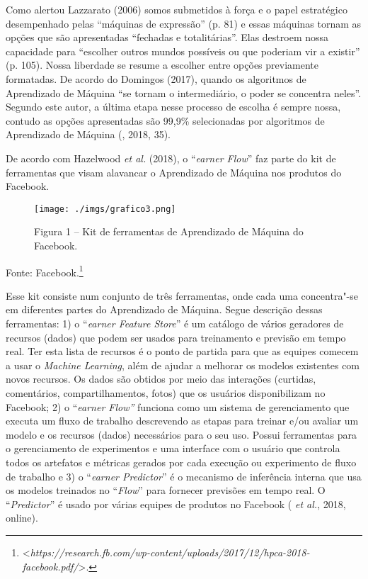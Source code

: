 Como alertou Lazzarato (2006) somos submetidos à força e o papel
estratégico desempenhado pelas ``máquinas de expressão'' (p. 81) e essas
máquinas tornam as opções que são apresentadas ``fechadas e
totalitárias''. Elas destroem nossa capacidade para ``escolher outros
mundos possíveis ou que poderiam vir a existir'' (p. 105). Nossa
liberdade se resume a escolher entre opções previamente formatadas. De
acordo do Domingos (2017), quando os algoritmos de Aprendizado de
Máquina ``se tornam o intermediário, o poder se concentra neles''.
Segundo este autor, a última etapa nesse processo de escolha é sempre
nossa, contudo as opções apresentadas são 99,9\% selecionadas por
algoritmos de Aprendizado de Máquina (, 2018, 35).

De acordo com Hazelwood \emph{et al.} (2018), o ``\emph{earner Flow}'' faz
parte do kit de ferramentas que visam alavancar o Aprendizado de Máquina
nos produtos do Facebook.

\begin{figure}[!ht]
\centering
  \texttt{[image: ./imgs/grafico3.png]}
\caption{Figura 1 -- Kit de ferramentas de Aprendizado de Máquina do Facebook.}
 \end{figure}

Fonte: Facebook.\footnote{\textless{}\emph{https://research.fb.com/wp-content/uploads/2017/12/hpca-2018-facebook.pdf/}\textgreater{}.}

Esse kit consiste num conjunto de três ferramentas, onde cada uma
concentra"-se em diferentes partes do Aprendizado de Máquina. Segue
descrição dessas ferramentas: 1) o ``\emph{earner Feature Store}'' é
um catálogo de vários geradores de recursos (dados) que podem ser usados
para treinamento e previsão em tempo real. Ter esta lista de recursos é
o ponto de partida para que as equipes comecem a usar o \emph{Machine
Learning}, além de ajudar a melhorar os modelos existentes com novos
recursos. Os dados são obtidos por meio das interações (curtidas,
comentários, compartilhamentos, fotos) que os usuários disponibilizam no
Facebook; 2) o ``\emph{earner Flow''} funciona como um sistema de
gerenciamento que executa um fluxo de trabalho descrevendo as etapas
para treinar e/ou avaliar um modelo e os recursos (dados) necessários
para o seu uso. Possui ferramentas para o gerenciamento de experimentos
e uma interface com o usuário que controla todos os artefatos e métricas
gerados por cada execução ou experimento de fluxo de trabalho e 3) o
``\emph{earner Predictor}'' é o mecanismo de inferência interna que
usa os modelos treinados no ``\emph{Flow}'' para fornecer previsões em
tempo real. O ``\emph{Predictor}'' é usado por várias equipes de
produtos no Facebook ( \emph{et al.}, 2018, online).

